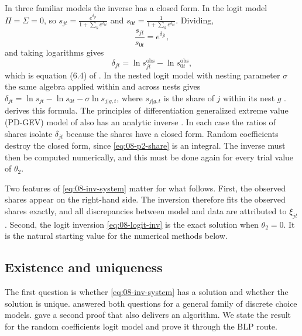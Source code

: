 In three familiar models the inverse has a closed form. In the logit model $\Pi = \Sigma = 0$, so
$s_{jt} = \frac{e^{\delta_{jt}}}{1 + \sum_k e^{\delta_{kt}}}$ and $s_{0t} = \frac{1}{1 + \sum_k
e^{\delta_{kt}}}$. Dividing,
\begin{equation*}
  \frac{s_{jt}}{s_{0t}} = e^{\delta_{jt}},
\end{equation*}
and taking logarithms gives
\begin{equation}\label{eq:08-logit-inv}
  \delta_{jt} = \ln s^{\text{obs}}_{jt} - \ln s^{\text{obs}}_{0t},
\end{equation}
which is equation (6.4) of \citet{BerryLevinsohnPakes1995}. In the nested logit model with nesting
parameter $\sigma$ the same algebra applied within and across nests gives $\delta_{jt} = \ln s_{jt} - \ln
s_{0t} - \sigma\ln s_{j|g,t}$, where $s_{j|g,t}$ is the share of $j$ within its nest $g$ \citep{Berry1994}.
 derives this formula. The principles of differentiation generalized extreme value (PD-GEV) model of
\citet{BresnahanSternTrajtenberg1997} also has an analytic inverse \citep[p.~532]{Nevo2000a}. In each case
the ratios of shares isolate $\delta_{jt}$ because the shares have a closed form. Random coefficients
destroy the closed form, since \eqref{eq:08-p2-share} is an integral. The inverse must then be computed
numerically, and this must be done again for every trial value of $\theta_2$.

Two features of \eqref{eq:08-inv-system} matter for what follows. First, the observed shares appear on the
right-hand side. The inversion therefore fits the observed shares exactly, and all discrepancies between
model and data are attributed to $\xi_{jt}$. Second, the logit inversion \eqref{eq:08-logit-inv} is the
exact solution when $\theta_2 = 0$. It is the natural starting value for the numerical methods below.

\subsection{Existence and uniqueness}\label{sec:08-inv-existence}

The first question is whether \eqref{eq:08-inv-system} has a solution and whether the solution is unique.
\citet[p.~249 and Appendix]{Berry1994} answered both questions for a general family of discrete choice
models. \citet[Appendix I]{BerryLevinsohnPakes1995} gave a second proof that also delivers an algorithm.
We state the result for the random coefficients logit model and prove it through the BLP route.

